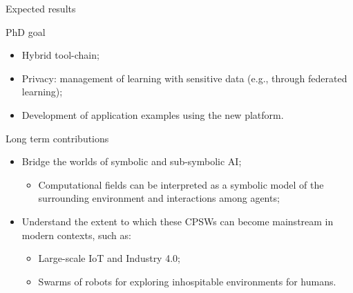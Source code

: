 \documentclass[presentation]{beamer}\mode<presentation>{\usetheme{AMSBolognaFC}}
\begin{document}

	


\begin{frame}[c]{Expected results}


\begin{block}{PhD goal}
	\begin{itemize}
		\item Hybrid tool-chain;
		\item Privacy: management of learning with sensitive data 
			(e.g., through federated learning);
		\item Development of application examples using the new platform.
	\end{itemize}
\end{block}

\begin{alertblock}{Long term contributions}
	\begin{itemize}
		\item Bridge the worlds of symbolic and sub-symbolic AI;
		\begin{itemize}
			\item Computational fields can be interpreted as a symbolic model 
				of the surrounding environment and interactions among agents;
		\end{itemize}
		\item Understand the extent to which these CPSWs can 
			become mainstream in modern contexts, such as:
		\begin{itemize}
			\item Large-scale IoT and Industry 4.0;
			\item Swarms of robots for exploring inhospitable environments for humans.
		\end{itemize}
	\end{itemize}
\end{alertblock}

\end{frame}
\end{document}
